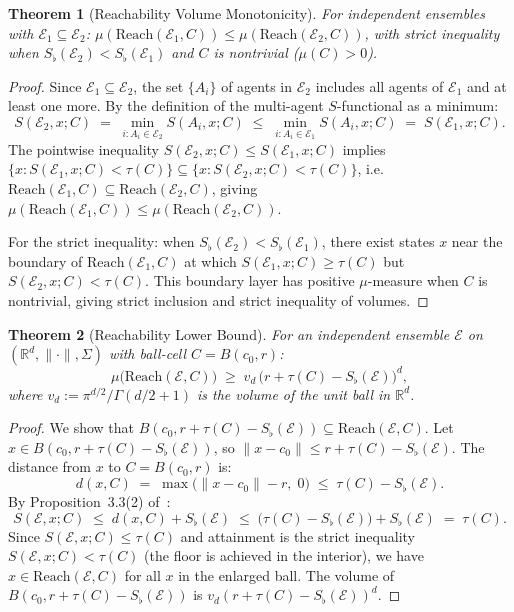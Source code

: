 \documentclass[twocolumn,11pt,a4paper]{article}
\newtheorem{theorem}{Theorem}[section]
\theoremstyle{remark}
\newcommand{\R}{\mathbb{R}}
\newcommand{\Sflat}{S_{\flat}}
\newcommand{\Reach}{\mathrm{Reach}}
\newcommand{\tol}{\tau}
\newcommand{\Ens}{\mathcal{E}}            %
\begin{document}
\begin{theorem}[Reachability Volume Monotonicity]
\label{thm:reach-monotone}
For independent ensembles with $\Ens_1 \subseteq \Ens_2$:
$\mu(\Reach(\Ens_1, C)) \le \mu(\Reach(\Ens_2, C))$, with strict inequality
when $\Sflat(\Ens_2) < \Sflat(\Ens_1)$ and $C$ is nontrivial ($\mu(C) > 0$).
\end{theorem}
\begin{proof}
Since $\Ens_1 \subseteq \Ens_2$, the set $\{A_i\}$ of agents in $\Ens_2$
includes all agents of $\Ens_1$ and at least one more.  By the definition of
the multi-agent $S$-functional as a minimum:
\[
  S(\Ens_2, x; C) \;=\; \min_{i: A_i \in \Ens_2} S(A_i, x; C)
  \;\le\; \min_{i: A_i \in \Ens_1} S(A_i, x; C) \;=\; S(\Ens_1, x; C).
\]
The pointwise inequality $S(\Ens_2, x; C) \le S(\Ens_1, x; C)$ implies
$\{x: S(\Ens_1, x; C) < \tol(C)\} \subseteq \{x: S(\Ens_2, x; C) <
\tol(C)\}$, i.e.\ $\Reach(\Ens_1, C) \subseteq \Reach(\Ens_2, C)$, giving
$\mu(\Reach(\Ens_1, C)) \le \mu(\Reach(\Ens_2, C))$.

For the strict inequality: when $\Sflat(\Ens_2) < \Sflat(\Ens_1)$, there
exist states $x$ near the boundary of $\Reach(\Ens_1, C)$ at which
$S(\Ens_1, x; C) \ge \tol(C)$ but $S(\Ens_2, x; C) < \tol(C)$.  This
boundary layer has positive $\mu$-measure when $C$ is nontrivial, giving
strict inclusion and strict inequality of volumes.
\end{proof}

\begin{theorem}[Reachability Lower Bound]
\label{thm:reach-lower}
For an independent ensemble $\Ens$ on $(\R^d, \|\cdot\|, \Sigma)$ with
ball-cell $C = B(c_0, r)$:
\[
  \mu\bigl(\Reach(\Ens, C)\bigr)
  \;\ge\; v_d \,\bigl(r + \tol(C) - \Sflat(\Ens)\bigr)^d,
\]
where $v_d := \pi^{d/2}/\Gamma(d/2+1)$ is the volume of the unit ball in
$\R^d$.
\end{theorem}
\begin{proof}
We show that $B(c_0, r + \tol(C) - \Sflat(\Ens)) \subseteq \Reach(\Ens, C)$.
Let $x \in B(c_0, r + \tol(C) - \Sflat(\Ens))$, so $\|x - c_0\| \le r +
\tol(C) - \Sflat(\Ens)$.  The distance from $x$ to $C = B(c_0, r)$ is:
\[
  d(x, C) \;=\; \max\bigl(\|x - c_0\| - r,\; 0\bigr)
  \;\le\; \tol(C) - \Sflat(\Ens).
\]
By Proposition~3.3(2) of~\cite{sachikonye2025agents}:
\[
  S(\Ens, x; C) \;\le\; d(x, C) + \Sflat(\Ens)
  \;\le\; \bigl(\tol(C) - \Sflat(\Ens)\bigr) + \Sflat(\Ens)
  \;=\; \tol(C).
\]
Since $S(\Ens, x; C) \le \tol(C)$ and attainment is the strict inequality
$S(\Ens, x; C) < \tol(C)$ (the floor is achieved in the interior), we have
$x \in \Reach(\Ens, C)$ for all $x$ in the enlarged ball.  The volume of
$B(c_0, r + \tol(C) - \Sflat(\Ens))$ is $v_d (r + \tol(C) - \Sflat(\Ens))^d$.
\end{proof}
\end{document}
